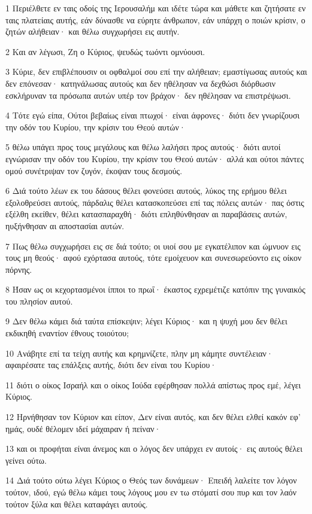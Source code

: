 \par 1 Περιέλθετε εν ταις οδοίς της Ιερουσαλήμ και ιδέτε τώρα και μάθετε και ζητήσατε εν ταις πλατείαις αυτής, εάν δύνασθε να εύρητε άνθρωπον, εάν υπάρχη ο ποιών κρίσιν, ο ζητών αλήθειαν· και θέλω συγχωρήσει εις αυτήν.
\par 2 Και αν λέγωσι, Ζη ο Κύριος, ψευδώς τωόντι ομνύουσι.
\par 3 Κύριε, δεν επιβλέπουσιν οι οφθαλμοί σου επί την αλήθειαν; εμαστίγωσας αυτούς και δεν επόνεσαν· κατηνάλωσας αυτούς και δεν ηθέλησαν να δεχθώσι διόρθωσιν εσκλήρυναν τα πρόσωπα αυτών υπέρ τον βράχον· δεν ηθέλησαν να επιστρέψωσι.
\par 4 Τότε εγώ είπα, Ούτοι βεβαίως είναι πτωχοί· είναι άφρονες· διότι δεν γνωρίζουσι την οδόν του Κυρίου, την κρίσιν του Θεού αυτών·
\par 5 θέλω υπάγει προς τους μεγάλους και θέλω λαλήσει προς αυτούς· διότι αυτοί εγνώρισαν την οδόν του Κυρίου, την κρίσιν του Θεού αυτών· αλλά και ούτοι πάντες ομού συνέτριψαν τον ζυγόν, έκοψαν τους δεσμούς.
\par 6 Διά τούτο λέων εκ του δάσους θέλει φονεύσει αυτούς, λύκος της ερήμου θέλει εξολοθρεύσει αυτούς, πάρδαλις θέλει κατασκοπεύσει επί τας πόλεις αυτών· πας όστις εξέλθη εκείθεν, θέλει κατασπαραχθή· διότι επληθύνθησαν αι παραβάσεις αυτών, ηυξήνθησαν αι αποστασίαι αυτών.
\par 7 Πως θέλω συγχωρήσει εις σε διά τούτο; οι υιοί σου με εγκατέλιπον και ώμνυον εις τους μη θεούς· αφού εχόρτασα αυτούς, τότε εμοίχευον και συνεσωρεύοντο εις οίκον πόρνης.
\par 8 Ήσαν ως οι κεχορτασμένοι ίπποι το πρωΐ· έκαστος εχρεμέτιζε κατόπιν της γυναικός του πλησίον αυτού.
\par 9 Δεν θέλω κάμει διά ταύτα επίσκεψιν; λέγει Κύριος· και η ψυχή μου δεν θέλει εκδικηθή εναντίον έθνους τοιούτου;
\par 10 Ανάβητε επί τα τείχη αυτής και κρημνίζετε, πλην μη κάμητε συντέλειαν· αφαιρέσατε τας επάλξεις αυτής, διότι δεν είναι του Κυρίου·
\par 11 διότι ο οίκος Ισραήλ και ο οίκος Ιούδα εφέρθησαν πολλά απίστως προς εμέ, λέγει Κύριος.
\par 12 Ηρνήθησαν τον Κύριον και είπον, Δεν είναι αυτός, και δεν θέλει ελθεί κακόν εφ' ημάς, ουδέ θέλομεν ιδεί μάχαιραν ή πείναν·
\par 13 και οι προφήται είναι άνεμος και ο λόγος δεν υπάρχει εν αυτοίς· εις αυτούς θέλει γείνει ούτω.
\par 14 Διά τούτο ούτω λέγει Κύριος ο Θεός των δυνάμεων· Επειδή λαλείτε τον λόγον τούτον, ιδού, εγώ θέλω κάμει τους λόγους μου εν τω στόματί σου πυρ και τον λαόν τούτον ξύλα και θέλει καταφάγει αυτούς.
